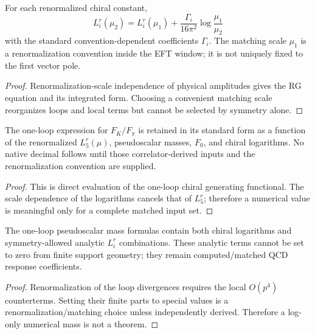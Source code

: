 \documentclass[12pt,a4paper]{article}
\begin{document}


\begin{theorem}
\label{p11:thm:native-chiral-running}

For each renormalized chiral constant,
\[
L_i^r(\mu_2)=L_i^r(\mu_1)+\frac{\Gamma_i}{16\pi^2}\log\frac{\mu_1}{\mu_2}
\]
with the standard convention-dependent coefficients \(\Gamma_i\).  The matching scale \(\mu_1\) is a renormalization convention inside the EFT window; it is not uniquely fixed to the first vector pole.
\label{p11:eq:native-chiral-scale}
\label{p11:eq:native-Li-running}
\label{p11:eq:native-chiral-logs-numeric}
\end{theorem}
\begin{proof}

Renormalization-scale independence of physical amplitudes gives the RG equation and its integrated form.  Choosing a convenient matching scale reorganizes loops and local terms but cannot be selected by symmetry alone.
\end{proof}

\begin{corollary}
\label{p11:cor:native-one-loop-FK-Fpi}

The one-loop expression for \(F_K/F_\pi\) is retained in its standard form as a function of the renormalized \(L_5^r(\mu)\), pseudoscalar masses, \(F_0\), and chiral logarithms.  No native decimal follows until those correlator-derived inputs and the renormalization convention are supplied.
\label{p11:eq:native-FK-Fpi-one-loop}
\label{p11:eq:native-FK-Fpi-one-loop-numeric}
\end{corollary}
\begin{proof}

This is direct evaluation of the one-loop chiral generating functional.  The scale dependence of the logarithms cancels that of \(L_5^r\); therefore a numerical value is meaningful only for a complete matched input set.
\end{proof}

\begin{corollary}
\label{p11:cor:native-one-loop-mass-logs}

The one-loop pseudoscalar mass formulas contain both chiral logarithms and symmetry-allowed analytic \(L_i^r\) combinations.  These analytic terms cannot be set to zero from finite support geometry; they remain computed/matched QCD response coefficients.
\label{p11:eq:native-one-loop-mass-logs-numeric}
\end{corollary}
\begin{proof}

Renormalization of the loop divergences requires the local \(O(p^4)\) counterterms.  Setting their finite parts to special values is a renormalization/matching choice unless independently derived.  Therefore a log-only numerical mass is not a theorem.
\end{proof}
\end{document}
